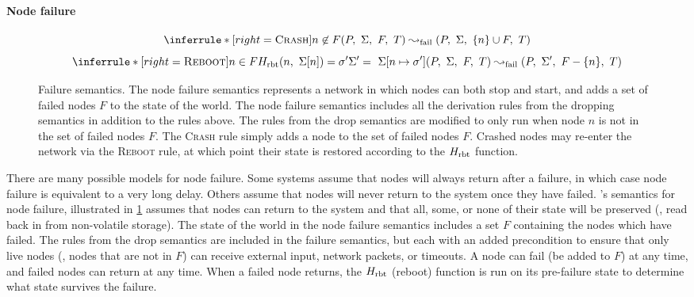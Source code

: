 \paragraph{Node failure}

\begin{figure}[t]
  \centering

  \begin{footnotesize} \begin{spacing}{1.5} \[
    \inferrule*[right=\textsc{Crash}]{
      n \not\in F
    }{
      (P,\ \Sigma,\ F,\ T) \ffailstep (P,\ \Sigma,\ \{n\} \cup F,\ T)
    }
  \]\[
    \inferrule*[right=\textsc{Reboot}]{
      n \in F \\
      \fHrbt(n,\ \Sigma[n]) = \sigma' \\
      \Sigma' =\ \Sigma[n \mapsto \sigma'] \\
    }{
      (P,\ \Sigma,\ F,\ T) \ffailstep (P,\ \Sigma',\ F - \{n\},\ T)
    }
  \] \end{spacing} \end{footnotesize}

  \caption{Failure semantics.
    The node failure semantics represents a network in which nodes can both
    stop and start, and adds a set of failed nodes $F$ to the state of the
    world.
    The node failure semantics includes all the derivation rules from the
    dropping semantics in addition to the rules above.
    The rules from the drop semantics are modified to only run when node
    $n$ is not in the set of failed nodes $F$.
    The \textsc{Crash} rule simply adds a node to the set of failed nodes
    $F$.
    Crashed nodes may re-enter the network via the \textsc{Reboot} rule, at
  which point their state is restored according to the $H_{\mathrm{rbt}}$ function.}

\label{fig:failure-semantics}
\end{figure}

There are many possible models for node failure.
%
Some systems assume that nodes will always return after a failure, in which
case node failure is equivalent to a very long delay.
%
Others assume that nodes will never return to the system once they have
failed.
%
\Verdi's semantics for node failure, illustrated in
\cref{fig:failure-semantics} assumes that nodes can return to the system
and that all, some, or none of their state will be preserved (\ie, read back
in from non-volatile storage).
%
The state of the world in the node failure semantics includes a set $F$
containing the nodes which have failed.
%
The rules from the drop semantics are included in the failure semantics,
but each with an added precondition to ensure that only live nodes (\ie,
nodes that are not in $F$) can receive external input, network packets, or
timeouts.
%
A node can fail (be added to $F$) at any time, and failed nodes can return
at any time.
%
When a failed node returns, the $H_{\mathrm{rbt}}$ (reboot) function is run on its
pre-failure state to determine what state survives the failure.

